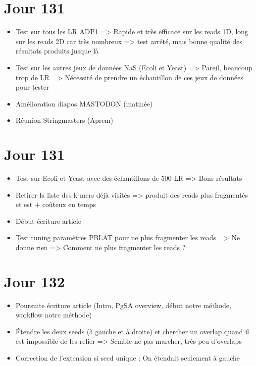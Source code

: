 \documentclass[12pt]{report}
\begin{document}
\section{Jour 131}

\begin{itemize}
	\item Test sur tous les LR ADP1 => Rapide et très efficace sur les reads 1D, long sur les reads 2D car très nombreux
		  => test arrêté, mais bonne qualité des résultats produits jusque là
		  
	\item Test sur les autres jeux de données NaS (Ecoli et Yeast) => Pareil, beaucoup trop de LR
		  => Nécessité de prendre un échantillon de ces jeux de données pour tester
	
	\item Amélioration diapos MASTODON (matinée)
	
	\item Réunion Stringmasters (Aprem)
\end{itemize}

\section{Jour 131}

\begin{itemize}
	\item Test sur Ecoli et Yeast avec des échantillons de 500 LR => Bons résultats
	
	\item Retirer la liste des k-mers déjà visités => produit des reads plus fragmentés et est + coûteux en temps
	
	\item Début écriture article
	
	\item Test tuning paramètres PBLAT pour ne plus fragmenter les reads => Ne donne rien
		  => Comment ne plus fragmenter les reads ?
\end{itemize}

\section{Jour 132}

\begin{itemize}
	\item Poursuite écriture article (Intro, PgSA overview, début notre méthode, workflow notre méthode)
	
	\item Étendre les deux seeds (à gauche et à droite) et chercher un overlap quand il est impossible de les relier
		  => Semble ne pas marcher, très peu d'overlaps
		  
	\item Correction de l'extension si seed unique : On étendait seulement à gauche
\end{itemize}
\end{document}
